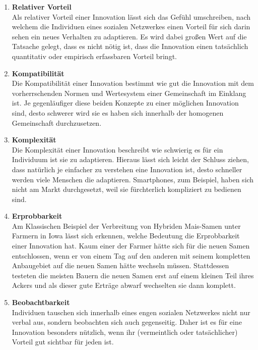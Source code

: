 \documentclass[12pt]{article}
\begin{document}
\begin{enumerate}
\item \textbf{Relativer Vorteil}\\ Als relativer Vorteil einer Innovation lässt sich das Gefühl umschreiben, nach welchem die Individuen eines sozialen Netzwerkes einen Vorteil für sich darin sehen ein neues Verhalten zu adaptieren. Es wird dabei großen Wert auf die Tatsache gelegt, dass es nicht nötig ist, dass die Innovation einen tatsächlich quantitativ oder empirisch erfassbaren Vorteil bringt.
\item \textbf{Kompatibilität}\\ Die Kompatibilität einer Innovation bestimmt wie gut die Innovation mit dem vorherrschenden Normen und Wertesystem einer Gemeinschaft im Einklang ist. Je gegenläufiger diese beiden Konzepte zu einer möglichen Innovation sind, desto schwerer wird sie es haben sich innerhalb der homogenen Gemeinschaft durchzusetzen.
\item \textbf{Komplexität}\\ Die Komplexität einer Innovation beschreibt wie schwierig es für ein Individuum ist sie zu adaptieren. Hieraus lässt sich leicht der Schluss ziehen, dass natürlich je einfacher zu verstehen eine Innovation ist, desto schneller werden viele Menschen die adaptieren. Smartphones, zum Beispiel, haben sich nicht am Markt durchgesetzt, weil sie fürchterlich kompliziert zu bedienen sind.
\item \textbf{Erprobbarkeit} \\ Am Klassischen Beispiel der Verbreitung von Hybriden Mais-Samen unter Farmern in Iowa lässt sich erkennen, welche Bedeutung die Erprobbarkeit einer Innovation hat. Kaum einer der Farmer hätte sich für die neuen Samen entschlossen, wenn er von einem Tag auf den anderen mit seinem kompletten Anbaugebiet auf die neuen Samen hätte wechseln müssen. Stattdessen testeten die meisten Bauern die neuen Samen erst auf einem kleinen Teil ihres Ackers und als dieser gute Erträge abwarf wechselten sie dann komplett.
\item \textbf{Beobachtbarkeit} \\ Individuen tauschen sich innerhalb eines engen sozialen Netzwerkes nicht nur verbal aus, sondern beobachten sich auch gegenseitig. Daher ist es für eine Innovation besonders nützlich, wenn ihr (vermeintlich oder tatsächlicher) Vorteil gut sichtbar für jeden ist.
\end{enumerate}
\end{document}
